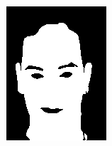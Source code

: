 \begin{figure}[h]
\begin{subfigure}[b]{0.18\textwidth}
         \includegraphics[width=\textwidth]{images/results/base/hh78.color.d3_y.png}
     \end{subfigure}
    \hfill
     \begin{subfigure}[b]{0.18\textwidth}
         \centering

\end{subfigure}
\end{figure}
